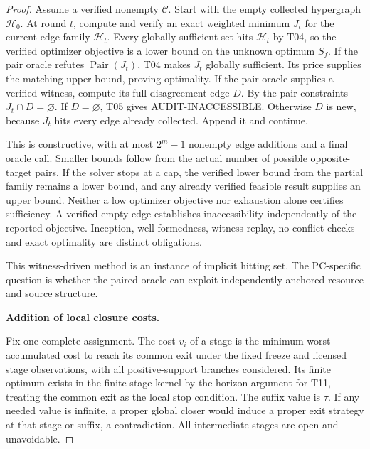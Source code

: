 \begin{proof}

Assume a verified nonempty \(\mathcal C\). Start with the empty collected hypergraph \(\mathcal H_0\). At round \(t\), compute and verify an exact weighted minimum \(J_t\) for the current edge family \(\mathcal H_t\). Every globally sufficient set hits \(\mathcal H_t\) by T04, so the verified optimizer objective is a lower bound on the unknown optimum \(S_f\). If the pair oracle refutes \(\operatorname{Pair}(J_t)\), T04 makes \(J_t\) globally sufficient. Its price supplies the matching upper bound, proving optimality. If the pair oracle supplies a verified witness, compute its full disagreement edge \(D\). By the pair constraints \(J_t\cap D=\varnothing\). If \(D=\varnothing\), T05 gives AUDIT-INACCESSIBLE. Otherwise \(D\) is new, because \(J_t\) hits every edge already collected. Append it and continue.

This is constructive, with at most \(2^m-1\) nonempty edge additions and a final oracle call. Smaller bounds follow from the actual number of possible opposite-target pairs. If the solver stops at a cap, the verified lower bound from the partial family remains a lower bound, and any already verified feasible result supplies an upper bound. Neither a low optimizer objective nor exhaustion alone certifies sufficiency. A verified empty edge establishes inaccessibility independently of the reported objective. Inception, well-formedness, witness replay, no-conflict checks and exact optimality are distinct obligations.

This witness-driven method is an instance of implicit hitting set. The PC-specific question is whether the paired oracle can exploit independently anchored resource and source structure.

\textbf{Addition of local closure costs.}

Fix one complete assignment. The cost \(v_i\) of a stage is the minimum worst accumulated cost to reach its common exit under the fixed freeze and licensed stage observations, with all positive-support branches considered. Its finite optimum exists in the finite stage kernel by the horizon argument for T11, treating the common exit as the local stop condition. The suffix value is \(\tau\). If any needed value is infinite, a proper global closer would induce a proper exit strategy at that stage or suffix, a contradiction. All intermediate stages are open and unavoidable.


\end{proof}
